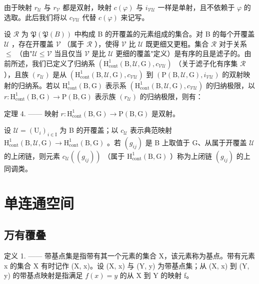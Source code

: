 由于映射 \(r_{\mathcal{U}}\) 与 \(r_{\mathcal{V}}\) 都是双射，映射 \(c(\varphi)\) 与 \(i_{\mathcal{V}\mathcal{U}}\) 一样是单射，且不依赖于 \(\varphi\) 的选取。此后我们将以 \(c_{\mathcal{V}\mathcal{U}}\) 代替 \(c(\varphi)\) 来记写。

设 \(\mathcal{R}\) 为 \(\mathfrak{P}(\mathfrak{P}(B))\) 中构成 B 的开覆盖的元素组成的集合。对 B 的每个开覆盖 \(\mathcal{U}\) ，存在开覆盖 \(\mathcal{V}\) （属于 \(\mathcal{R}\) ），使得 \(\mathcal{V}\) 比 \(\mathcal{U}\) 既更细又更粗。集合 \(\mathcal{R}\) 对于关系 \(\leqslant\) （由"\(\mathcal{U} \leqslant \mathcal{V}\) 当且仅当 \(\mathcal{V}\) 是比 \(\mathcal{U}\) 更细的覆盖"定义）是有序的且是滤子的。由前所述，我们已定义了归纳系 \((\mathrm{H}_{\mathrm{cont}}^{1}(\mathrm{B},\mathcal{U},\mathrm{G}),c_{\mathcal{V}\mathcal{U}})\) （关于滤子化有序集 \(\mathcal{R}\) ），且族 \((r_{\mathcal{U}})\) 是从 \((\mathrm{H}_{\mathrm{cont}}^{1}(\mathrm{B},\mathcal{U},\mathrm{G}),c_{\mathcal{V}\mathcal{U}})\) 到 \((\mathrm{P}(\mathrm{B},\mathcal{U},\mathrm{G}),i_{\mathcal{V}\mathcal{U}})\) 的双射映射的归纳系。若以 \(\mathrm{H}_{\mathrm{cont}}^{1}(\mathrm{B},\mathrm{G})\) 表示系 \((\mathrm{H}_{\mathrm{cont}}^{1}(\mathrm{B},\mathcal{U},\mathrm{G}),c_{\mathcal{V}\mathcal{U}})\) 的归纳极限，以 \(r\colon \mathrm{H}_{\mathrm{cont}}^{1}(\mathrm{B},\mathrm{G})\to \mathrm{P}(\mathrm{B},\mathrm{G})\) 表示族 \((r_{\mathcal{U}})\) 的归纳极限，则有：

定理 4. —— 映射 \(r\colon \mathrm{H}_{\mathrm{cont}}^{1}(\mathrm{B},\mathrm{G})\to \mathrm{P}(\mathrm{B},\mathrm{G})\) 是双射。

设 \(\mathcal{U} = (\mathrm{U}_i)_{i\in \mathrm{I}}\) 为 B 的开覆盖；以 \(c_{\mathcal{U}}\) 表示典范映射 \(\mathrm{H}_{\mathrm{cont}}^{1}(\mathrm{B},\mathcal{U},\mathrm{G})\to \mathrm{H}_{\mathrm{cont}}^{1}(\mathrm{B},\mathrm{G})\) 。若 \((g_{ij})\) 是 B 上取值于 G、从属于开覆盖 \(\mathcal{U}\) 的上闭链，则元素 \(c_{\mathcal{U}}((g_{ij}))\) （属于 \(\mathrm{H}_{\mathrm{cont}}^{1}(\mathrm{B},\mathrm{G})\) ）称为上闭链 \((g_{ij})\) 的上同调类。

\section{单连通空间}

\subsection{万有覆叠}

定义 1. —— 带基点集是指带有其一个元素的集合 X，该元素称为基点。带有元素 x 的集合 X 有时记作 (X, x)。设 (X, x) 与 (Y, y) 为带基点集；从 (X, x) 到 (Y, y) 的带基点映射是指满足 \(f(x) = y\) 的从 X 到 Y 的映射 f。

